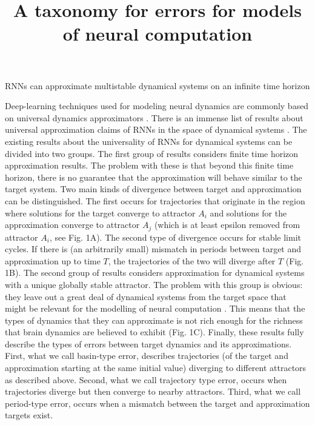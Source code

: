 \documentclass[10pt]{article}
\begin{document}

\title{A taxonomy for errors for models of neural computation}

\begin{center}
\Large{RNNs can approximate multistable dynamical systems on an infinite time horizon}
\end{center}

\noindent
Deep-learning techniques used for modeling neural dynamics are commonly based on universal dynamics approximators \citep{durstewitz2023reconstructing}.
There is an immense list of results about universal approximation claims of RNNs in the space of dynamical systems \citep{li2022approximation,jiang2023brief}.
The existing results about the universality of RNNs for dynamical systems can be divided into two groups.
 The first group of results considers finite time horizon approximation results.
  The problem with these is that beyond this finite time horizon, there is no guarantee that the approximation will behave similar to the target system.
   Two main kinds of divergence between target and approximation can be distinguished.
   The first occurs for trajectories that originate in the region where solutions for the target converge to attractor $A_i$ and solutions for the approximation converge to attractor $A_j$ (which is at least epsilon removed from attractor $A_i$, see Fig. 1A). 
   The second type of divergence occurs for stable limit cycles. If there is (an arbitrarily small) mismatch in periods between target and approximation up to time $T$, the trajectories of the two will diverge after $T$ (Fig. 1B).
  The second group of results considers approximation for dynamical systems with a unique globally stable attractor.
   The problem with this group is obvious: they leave out a great deal of dynamical systems from the target space that might be relevant for the modelling of neural computation \citep{wong2006timeintegration,mante2013context}.
    This means that the types of dynamics that they can approximate is not rich enough for the richness that brain dynamics are believed to exhibit (Fig. 1C). 
Finally, these results fully describe the types of errors between target dynamics and its approximations.
  First, what we call basin-type error, describes trajectories (of the target and approximation starting at the same initial value) diverging to different attractors as described above.
  Second, what we call trajectory type error, occurs when trajectories diverge but then converge to nearby attractors. %
  Third, what we call period-type error, occurs when a mismatch between the target and approximation targets exist.
  
\end{document}
